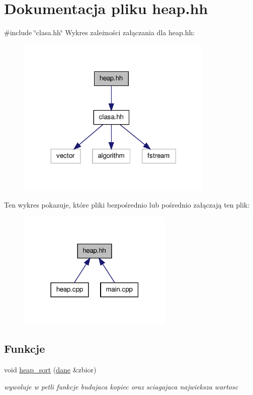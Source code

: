 \hypertarget{heap_8hh}{\section{\-Dokumentacja pliku heap.\-hh}
\label{heap_8hh}
}
{\ttfamily \#include \char`\"{}clasa.\-hh\char`\"{}}\*
\-Wykres zależności załączania dla heap.\-hh\-:\nopagebreak
\begin{figure}[H]
\begin{center}
\leavevmode
\includegraphics[width=266pt]{heap_8hh__incl}
\end{center}
\end{figure}
\-Ten wykres pokazuje, które pliki bezpośrednio lub pośrednio załączają ten plik\-:\nopagebreak
\begin{figure}[H]
\begin{center}
\leavevmode
\includegraphics[width=210pt]{heap_8hh__dep__incl}
\end{center}
\end{figure}
\subsection*{\-Funkcje}
\begin{DoxyCompactItemize}
\item 
void \hyperlink{heap_8hh_aa5d4073154327bd623b36d1070aa2827}{heap\-\_\-sort} (\hyperlink{classdane}{dane} \&zbior)
\begin{DoxyCompactList}\small\item\em wywoluje w petli funkcje budujaca kopiec oraz sciagajaca najwieksza wartosc \end{DoxyCompactList}\end{DoxyCompactItemize}


